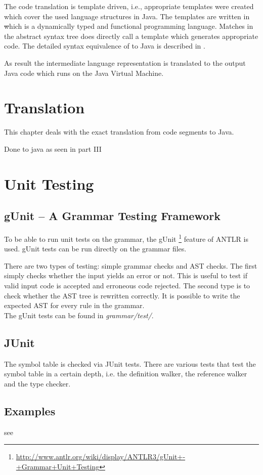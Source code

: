 The code translation is template driven, i.e., appropriate templates
were created which cover the used language structures in Java. The
templates are written in \st which is a dynamically typed and functional
programming language. Matches in the abstract syntax tree does directly
call a template which generates appropriate code. The detailed syntax
equivalence of \ooplss to Java is described in .

As result the intermediate language representation is translated to the
output Java code which runs on the Java Virtual Machine.

\section{Translation}
\label{ctr:translation}
This chapter deals with the exact translation from \ooplss code segments
to Java.

Done to java as seen in part III


\section{Unit Testing}
\subsection{gUnit -- A Grammar Testing Framework}

To be able to run unit tests on the grammar, the gUnit
\footnote{\href{http://www.antlr.org/wiki/display/ANTLR3/gUnit+-+Grammar+Unit+Testing}
{http://www.antlr.org/wiki/display/ANTLR3/gUnit+-+Grammar+Unit+Testing}}
feature of ANTLR is used. gUnit tests can be run directly on the grammar files.

There are two types of testing: simple grammar checks and AST checks. The 
first simply checks whether the input yields an error or not. This is useful
to test if valid input code is accepted and erroneous code rejected. The
second type is to check whether the AST tree is rewritten correctly. It is 
possible to write the expected AST for every rule in the grammar.\\

The gUnit tests can be found in \emph{grammar/test/}.


\subsection{JUnit}

The symbol table is checked via JUnit tests. There are various tests that 
test the symbol table in a certain depth, i.e. the definition walker, the
reference walker and the type checker.

\subsection{Examples}
see 
